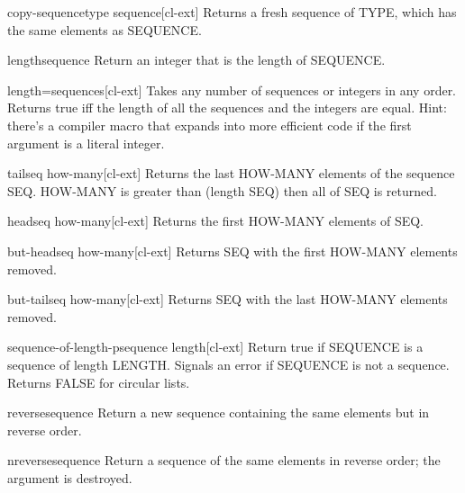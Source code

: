 \documentclass[10pt,english]{book}
\begin{document}
\begin{function}{copy-sequence}{type sequence}[cl-ext]
  Returns a fresh sequence of TYPE, which has the same elements as
  SEQUENCE.
\end{function}

\begin{function}{length}{sequence}
  Return an integer that is the length of SEQUENCE.
\end{function}

\begin{function}{length=}{\rest sequences}[cl-ext]
  Takes any number of sequences or integers in any order. Returns true
  iff the length of all the sequences and the integers are equal.
  Hint: there's a compiler macro that expands into more efficient code
  if the first argument is a literal integer.
\end{function}

\begin{function}{tail}{seq \op how-many}[cl-ext]
  Returns the last HOW-MANY elements of the sequence SEQ. HOW-MANY is
  greater than (length SEQ) then all of SEQ is returned.
\end{function}

\begin{function}{head}{seq \op how-many}[cl-ext]
  Returns the first HOW-MANY elements of SEQ.
\end{function}

\begin{function}{but-head}{seq \op how-many}[cl-ext]
  Returns SEQ with the first HOW-MANY elements removed.
\end{function}

\begin{function}{but-tail}{seq \op how-many}[cl-ext]
  Returns SEQ with the last HOW-MANY elements removed.
\end{function}

\begin{function}{sequence-of-length-p}{sequence length}[cl-ext]
  Return true if SEQUENCE is a sequence of length LENGTH. Signals an error if
  SEQUENCE is not a sequence. Returns FALSE for circular lists.
\end{function}

\begin{function}{reverse}{sequence}
  Return a new sequence containing the same elements but in reverse order.
\end{function}

\begin{function}{nreverse}{sequence}
  Return a sequence of the same elements in reverse order; the argument
  is destroyed.
\end{function}
\end{document}

